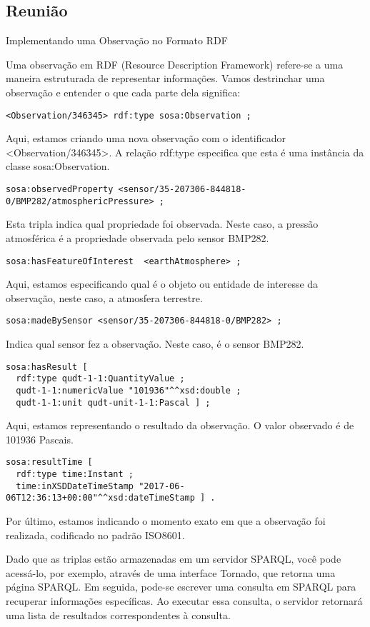 \subsection{Reunião}

Implementando uma Observação no Formato RDF

Uma observação em RDF (Resource Description Framework) refere-se a uma maneira estruturada de representar informações. Vamos destrinchar uma observação e entender o que cada parte dela significa:

\begin{verbatim}
<Observation/346345> rdf:type sosa:Observation ;
\end{verbatim}

Aqui, estamos criando uma nova observação com o identificador <Observation/346345>. A relação rdf:type especifica que esta é uma instância da classe sosa:Observation.

\begin{verbatim}
sosa:observedProperty <sensor/35-207306-844818-0/BMP282/atmosphericPressure> ;
\end{verbatim}

Esta tripla indica qual propriedade foi observada. Neste caso, a pressão atmosférica é a propriedade observada pelo sensor BMP282.

\begin{verbatim}
sosa:hasFeatureOfInterest  <earthAtmosphere> ;
\end{verbatim}

Aqui, estamos especificando qual é o objeto ou entidade de interesse da observação, neste caso, a atmosfera terrestre.

\begin{verbatim}
sosa:madeBySensor <sensor/35-207306-844818-0/BMP282> ;
\end{verbatim}

Indica qual sensor fez a observação. Neste caso, é o sensor BMP282.

\begin{verbatim}
sosa:hasResult [
  rdf:type qudt-1-1:QuantityValue ;
  qudt-1-1:numericValue "101936"^^xsd:double ;
  qudt-1-1:unit qudt-unit-1-1:Pascal ] ;
\end{verbatim}

Aqui, estamos representando o resultado da observação. O valor observado é de 101936 Pascais.

\begin{verbatim}
sosa:resultTime [
  rdf:type time:Instant ;
  time:inXSDDateTimeStamp "2017-06-06T12:36:13+00:00"^^xsd:dateTimeStamp ] .
\end{verbatim}

Por último, estamos indicando o momento exato em que a observação foi realizada, codificado no padrão ISO8601.

Dado que as triplas estão armazenadas em um servidor SPARQL, você pode acessá-lo, por exemplo, através de uma interface Tornado, que retorna uma página SPARQL. Em seguida, pode-se escrever uma consulta em SPARQL para recuperar informações específicas. Ao executar essa consulta, o servidor retornará uma lista de resultados correspondentes à consulta.

